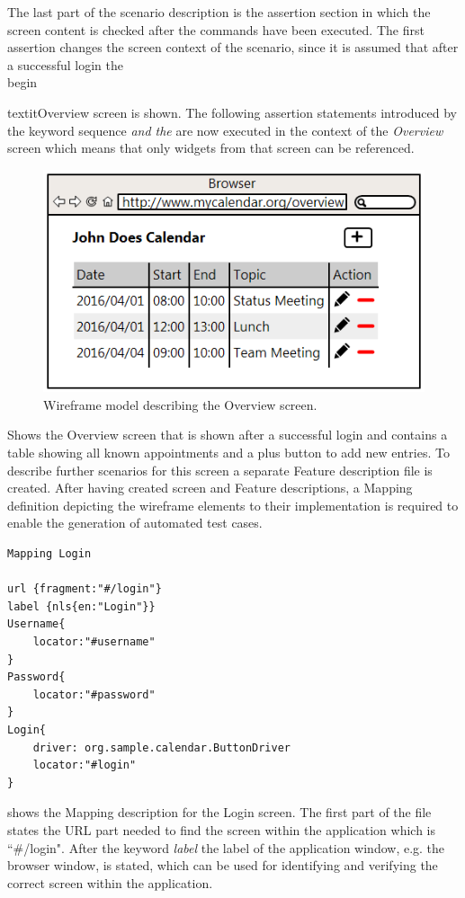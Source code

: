 \documentclass{sig-alternate-05-2015}
\begin{document}
The last part of the scenario description is the assertion section in which the screen content is checked after the commands have been executed.
The first assertion changes the screen context of the scenario, since it is assumed that after a successful login the \\begin{textit{Overview} screen is shown.
The following assertion statements introduced by the keyword sequence \textit{and the} are now executed in the context of the \textit{Overview} screen which means that only widgets from that screen can be referenced.

\begin{figure}[h]
	\centering
	\includegraphics[width=0.8\linewidth]{Overview.png}
	\caption{Wireframe model describing the Overview screen.}
	\label{fig:overview}
\end{figure}

 Shows the Overview screen that is shown after a successful login and contains a table showing all known appointments and a plus button to add new entries.
To describe further scenarios for this screen a separate Feature description file is created.
After having created screen and Feature descriptions, a Mapping definition depicting the wireframe elements to their implementation is required to enable the generation of automated test cases.

\begin{lstlisting}[captionpos=b, caption=Mapping Description: Login Screen., label={lst:mappinglogin}, language=dsl]
Mapping Login

url {fragment:"#/login"}
label {nls{en:"Login"}}
Username{
	locator:"#username"
}
Password{
	locator:"#password"
}
Login{ 
    driver: org.sample.calendar.ButtonDriver
    locator:"#login"
}
\end{lstlisting}

 shows the Mapping description for the Login screen.
The first part of the file states the URL part needed to find the screen within the application which is ``\#/login". 
After the keyword \textit{label} the label of the application window, e.g. the browser window, is stated, which can be used for identifying and verifying the correct screen within the application.

}
\end{document}
